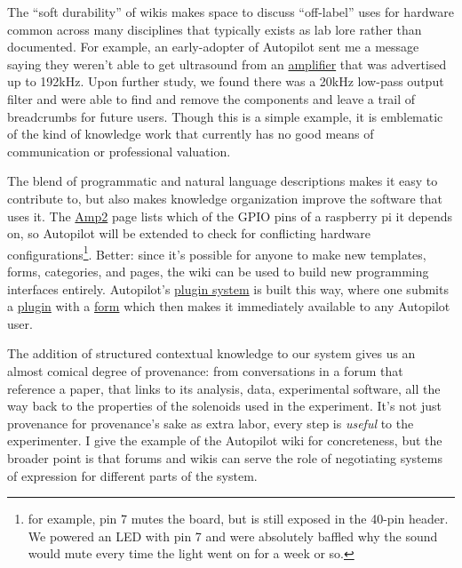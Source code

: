 \documentclass[10pt]{tufte-book}
\begin{document}
The ``soft durability'' of wikis makes space to discuss ``off-label''
uses for hardware common across many disciplines that typically exists
as lab lore rather than documented. For example, an early-adopter of
Autopilot sent me a message saying they weren't able to get ultrasound
from an
\href{https://wiki.auto-pi-lot.com/index.php/HiFiBerry_Amp2}{amplifier}
that was advertised up to 192kHz. Upon further study, we found there was
a 20kHz low-pass output filter and were able to find and remove the
components and leave a trail of breadcrumbs for future users. Though
this is a simple example, it is emblematic of the kind of knowledge work
that currently has no good means of communication or professional
valuation.

The blend of programmatic and natural language descriptions makes it
easy to contribute to, but also makes knowledge organization improve the
software that uses it. The
\href{https://wiki.auto-pi-lot.com/index.php/HiFiBerry_Amp2}{Amp2} page
lists which of the GPIO pins of a raspberry pi it depends on, so
Autopilot will be extended to check for conflicting hardware
configurations\footnote{for example, pin 7 mutes the board, but is still
  exposed in the 40-pin header. We powered an LED with pin 7 and were
  absolutely baffled why the sound would mute every time the light went
  on for a week or so.}. Better: since it's possible for anyone to make
new templates, forms, categories, and pages, the wiki can be used to
build new programming interfaces entirely. Autopilot's
\href{https://docs.auto-pi-lot.com/en/latest/guide/plugins.html}{plugin
system} is built this way, where one submits a
\href{https://wiki.auto-pi-lot.com/index.php/Autopilot_Plugins}{plugin}
with a
\href{https://wiki.auto-pi-lot.com/index.php/Form:Autopilot_Plugin}{form}
which then makes it immediately available to any Autopilot user.

The addition of structured contextual knowledge to our system gives us
an almost comical degree of provenance: from conversations in a forum
that reference a paper, that links to its analysis, data, experimental
software, all the way back to the properties of the solenoids used in
the experiment. It's not just provenance for provenance's sake as extra
labor, every step is \emph{useful} to the experimenter. I give the
example of the Autopilot wiki for concreteness, but the broader point is
that forums and wikis can serve the role of negotiating systems of
expression for different parts of the system.
\end{document}
